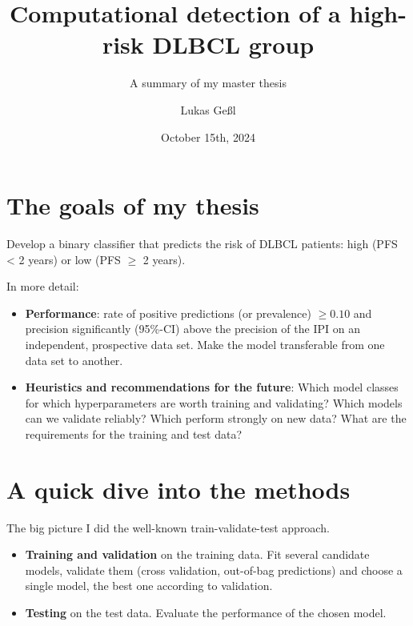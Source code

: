 \documentclass[10pt, aspectratio=169]{beamer}
\title{Computational detection of a high-risk DLBCL group}
\subtitle{A summary of my master thesis}
\date{October 15th, 2024}
\author{Lukas Geßl}
\institute{Chair of Statistical Bioinformatics, University of Regensburg}
\begin{document}
\maketitle

\section{The goals of my thesis}

\begin{frame}{}
  Develop a binary classifier that predicts the risk of DLBCL patients: high (PFS < 2 years) or low 
  (PFS $\geq$ 2 years). 

  In more detail:
  \begin{itemize}
    \item \textbf{Performance}: rate of positive predictions (or prevalence) $\geq \num{0.10}$ and 
      precision significantly (\num{95}\%-CI) above the precision of the IPI on an independent, 
      prospective data set. Make the model transferable from one data set to another.
    \item \textbf{Heuristics and recommendations for the future}: Which model classes for which 
      hyperparameters are worth training and validating? Which models can we validate reliably? 
      Which perform strongly on new data? What are the requirements for the training and test data?
  \end{itemize}
\end{frame}

\section{A quick dive into the methods}

\begin{frame}{The big picture}
  I did the well-known train-validate-test approach.
  \begin{itemize}
    \item \textbf{Training and validation} on the training data. Fit several candidate models, 
      validate them (cross validation, out-of-bag predictions) and choose a single model, the best 
      one according to validation.
    \item \textbf{Testing} on the test data. Evaluate the performance of the chosen model.
  \end{itemize}
\end{frame}
\end{document}
